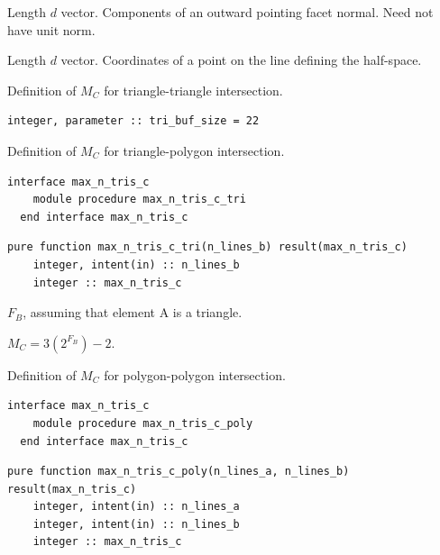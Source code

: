\documentclass{article}
\begin{document}
\begin{description}[font=\ttfamily\bfseries,leftmargin=2.2\parindent,labelindent=1.7\parindent,noitemsep]
  \item[normal] Length $d$ vector. Components of an outward pointing facet
    normal. Need not have unit norm.
  \item[point] Length $d$ vector. Coordinates of a point on the line defining
    the half-space.
\end{description}

\noindent Definition of $M_C$ for triangle-triangle intersection.
  
\begin{lstlisting}[language=FORTRAN] 
  integer, parameter :: tri_buf_size = 22
\end{lstlisting}

\noindent Definition of $M_C$ for triangle-polygon intersection.
  
\begin{lstlisting}[language=FORTRAN]
  interface max_n_tris_c
    module procedure max_n_tris_c_tri
  end interface max_n_tris_c
\end{lstlisting}

\begin{lstlisting}[language=FORTRAN]
  pure function max_n_tris_c_tri(n_lines_b) result(max_n_tris_c)
    integer, intent(in) :: n_lines_b
    integer :: max_n_tris_c
\end{lstlisting} 

\begin{description}[font=\ttfamily\bfseries,leftmargin=2.2\parindent,labelindent=1.7\parindent,noitemsep]
  \item[n\_lines\_b] $F_B$, assuming that element A is a triangle.
  \item[max\_n\_tris\_c] $M_C = 3 \left( 2^{F_B} \right) - 2$.
\end{description}

\noindent Definition of $M_C$ for polygon-polygon intersection.

\begin{lstlisting}[language=FORTRAN]
  interface max_n_tris_c
    module procedure max_n_tris_c_poly
  end interface max_n_tris_c
\end{lstlisting} 

\begin{lstlisting}[language=FORTRAN]
  pure function max_n_tris_c_poly(n_lines_a, n_lines_b) result(max_n_tris_c)
    integer, intent(in) :: n_lines_a
    integer, intent(in) :: n_lines_b
    integer :: max_n_tris_c
\end{lstlisting} 
\end{document}
